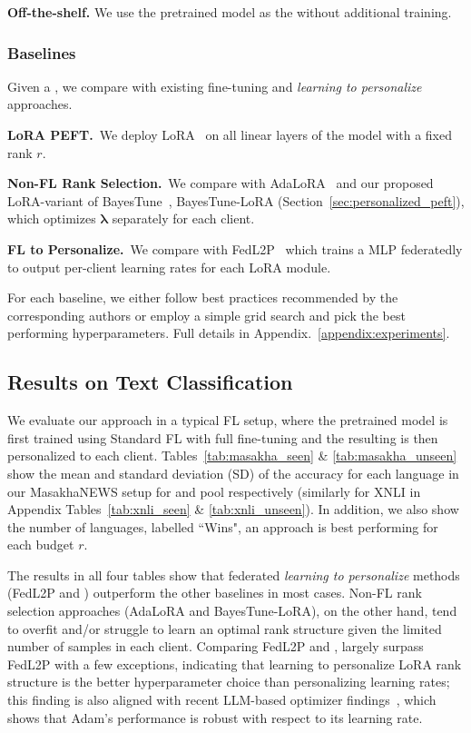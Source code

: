 \noindent\textbf{Off-the-shelf.} We use the pretrained model as the \basemodel{} without additional training.




\subsubsection{Baselines}\label{sec:baselines}

Given a \basemodel{}, we compare \method{} with existing fine-tuning and {\em learning to personalize} approaches. 

\noindent\textbf{LoRA PEFT.}~We deploy LoRA~\cite{hu2021lora} on all linear layers of the model with a fixed rank $r$. 

\noindent\textbf{Non-FL Rank Selection.}~We compare with AdaLoRA~\cite{adalora} and our proposed LoRA-variant of BayesTune~\cite{kim2023bayestune}, BayesTune-LoRA (Section~\ref{sec:personalized_peft}), which optimizes $\bm{\lambda}$ separately for each client. 

\noindent\textbf{FL to Personalize.}~We compare with FedL2P~\cite{royson2023fedl2p} which trains a MLP federatedly to output per-client learning rates for each LoRA module.

For each baseline, we either follow best practices recommended by the corresponding authors or employ a simple grid search and pick the best performing hyperparameters. Full details in Appendix.~\ref{appendix:experiments}.

\subsection{Results on Text Classification}\label{sec:text_class}

We evaluate our approach in a typical FL setup, where the pretrained model is first trained using Standard FL with full fine-tuning and the resulting \basemodel{} is then personalized to each client. Tables~\ref{tab:masakha_seen} \& \ref{tab:masakha_unseen} show the mean and standard deviation (SD) of the accuracy for each language in our MasakhaNEWS setup for \seen{} and \unseen{} pool respectively (similarly for XNLI in Appendix Tables~\ref{tab:xnli_seen} \& \ref{tab:xnli_unseen}). In addition, we also show the number of languages, labelled ``Wins", an approach is best performing for each budget $r$. 

The results in all four tables show that federated {\em learning to personalize} methods (FedL2P and \method{}) outperform the other baselines in most cases. Non-FL rank selection approaches (AdaLoRA and BayesTune-LoRA), on the other hand, tend to overfit and/or struggle to learn an optimal rank structure given the limited number of samples in each client. Comparing FedL2P and \method{}, \method{} largely surpass FedL2P with a few exceptions, indicating that learning to personalize LoRA rank structure is the better hyperparameter choice than personalizing learning rates; this finding is also aligned with recent LLM-based optimizer findings~\cite{zhao2025deconstructing}, which shows that Adam's performance is robust with respect to its learning rate.

